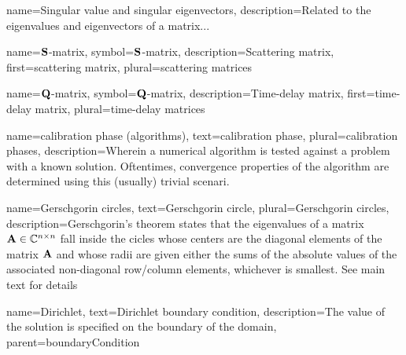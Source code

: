
%
{%
  name={Singular value and singular eigenvectors},
  description={Related to the eigenvalues and eigenvectors of a matrix...}
}

%
{%
  name={$\mathbf{S}$-matrix},
  symbol={$\mathbf{S}$-matrix},
  description={Scattering matrix},
  first={scattering matrix},
  plural={scattering matrices}
}

%
{%
  name={$\mathbf{Q}$-matrix},
  symbol={$\mathbf{Q}$-matrix},
  description={Time-delay matrix},
  first={time-delay matrix},
  plural={time-delay matrices}
}

%
{%
  name={calibration phase (algorithms)},
  text={calibration phase},
  plural={calibration phases},
  description={Wherein a numerical algorithm is tested against a problem with a%
		known solution. Oftentimes, convergence properties of the algorithm
		are determined using this (usually) trivial scenari.}
}

%
{%
  name={Gerschgorin circles},
  text={Gerschgorin circle},
  plural={Gerschgorin circles},
  description={Gerschgorin's theorem states that the eigenvalues of a matrix $\mathbf{A}\in\mathbb{C}^{n\times n}$ %
		fall inside the cicles whose centers are the diagonal elements of the matrix $\mathbf{A}$ and whose
		radii are given either the sums of the absolute values of the associated non-diagonal row/column elements,
		whichever is smallest. See main text for details}
}

%
{%
	name={Dirichlet},
	text={Dirichlet boundary condition},
	description={The value of the solution is specified on the boundary of the domain},
	parent={boundaryCondition}
}

